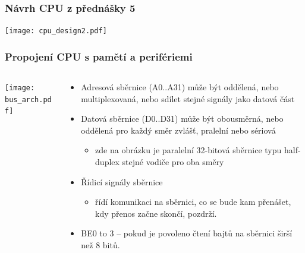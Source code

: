 \documentclass{beamer}
\begin{document}
\begin{frame}
\frametitle{Návrh CPU z přednášky 5}
\texttt{[image: cpu\_design2.pdf]}
\end{frame}

\begin{frame}
\frametitle{Propojení CPU s pamětí a perifériemi}
\begin{columns}
\begin{column}{0.4\textwidth}
\texttt{[image: bus\_arch.pdf]}
\end{column}
\begin{column}{0.6\textwidth}  
\begin{itemize}
\item Adresová sběrnice (A0..A31) může být oddělená, nebo multiplexovaná, nebo sdílet stejné signály jako datová část
\item Datová sběrnice (D0..D31) může být obousměrná, nebo oddělená pro každý směr zvlášť, pralelní nebo sériová
\begin{itemize}
\item zde na obrázku je paralelní 32-bitová sběrnice typu half-duplex stejné vodiče pro oba směry
\end{itemize}
\item Řídicí signály sběrnice
\begin{itemize}
\item řídí komunikaci na sběrnici, co se bude kam přenášet, kdy přenos začne skončí, pozdrží.
\end{itemize}
\item BE0 to 3 -- pokud je povoleno čtení bajtů na sběrnici širší než 8 bitů.
\end{itemize}
\end{column}
\end{columns}
\end{frame}
\end{document}
